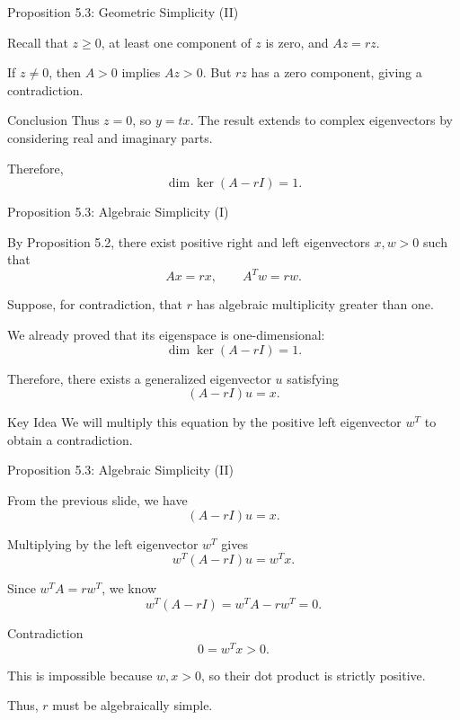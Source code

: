 \begin{frame}{Proposition 5.3: Geometric Simplicity (II)}
\small

Recall that $z\geq0$, at least one component of $z$ is zero, and $Az=rz$.

If $z\neq0$, then $A>0$ implies $Az>0$.
But $rz$ has a zero component,
giving a contradiction.

\begin{block}{Conclusion}
Thus $z=0$, so $y=tx$.
The result extends to complex eigenvectors
by considering real and imaginary parts.

Therefore,
\[
\boxed{\dim\ker(A-rI)=1.}
\]
\end{block}
\end{frame}

\begin{frame}{Proposition 5.3: Algebraic Simplicity (I)}
\small

By Proposition 5.2, there exist positive
right and left eigenvectors $x,w>0$ such that
\[
Ax=rx,\qquad A^Tw=rw.
\]

Suppose, for contradiction, that $r$
has algebraic multiplicity greater than one.

We already proved that its eigenspace is
one-dimensional:
\[
\dim\ker(A-rI)=1.
\]

Therefore, there exists a generalized
eigenvector $u$ satisfying
\[
(A-rI)u=x.
\]

\begin{block}{Key Idea}
We will multiply this equation by the
positive left eigenvector $w^T$ to
obtain a contradiction.
\end{block}
\end{frame}

\begin{frame}{Proposition 5.3: Algebraic Simplicity (II)}
\small

From the previous slide, we have
\[
(A-rI)u=x.
\]

Multiplying by the left eigenvector $w^T$ gives
\[
w^T(A-rI)u=w^Tx.
\]

Since $w^TA=rw^T$, we know
\[
w^T(A-rI)=w^TA-rw^T=0.
\]

\begin{block}{Contradiction}
\[
\boxed{0=w^Tx>0.}
\]

This is impossible because $w,x>0$,
so their dot product is strictly positive.

Thus, $r$ must be algebraically simple.
\end{block}
\end{frame}
